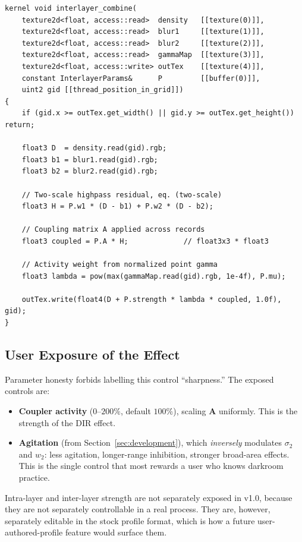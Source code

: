 \begin{lstlisting}[language=Metal, caption={Interlayer inhibition combine pass.}]
kernel void interlayer_combine(
    texture2d<float, access::read>  density   [[texture(0)]],
    texture2d<float, access::read>  blur1     [[texture(1)]],
    texture2d<float, access::read>  blur2     [[texture(2)]],
    texture2d<float, access::read>  gammaMap  [[texture(3)]],
    texture2d<float, access::write> outTex    [[texture(4)]],
    constant InterlayerParams&      P         [[buffer(0)]],
    uint2 gid [[thread_position_in_grid]])
{
    if (gid.x >= outTex.get_width() || gid.y >= outTex.get_height()) return;

    float3 D  = density.read(gid).rgb;
    float3 b1 = blur1.read(gid).rgb;
    float3 b2 = blur2.read(gid).rgb;

    // Two-scale highpass residual, eq. (two-scale)
    float3 H = P.w1 * (D - b1) + P.w2 * (D - b2);

    // Coupling matrix A applied across records
    float3 coupled = P.A * H;             // float3x3 * float3

    // Activity weight from normalized point gamma
    float3 lambda = pow(max(gammaMap.read(gid).rgb, 1e-4f), P.mu);

    outTex.write(float4(D + P.strength * lambda * coupled, 1.0f), gid);
}
\end{lstlisting}

\subsection{User Exposure of the Effect}

Parameter honesty forbids labelling this control ``sharpness.'' The exposed
controls are:

\begin{itemize}
\item \textbf{Coupler activity} ($0$--$200\%$, default $100\%$), scaling
$\mathbf{A}$ uniformly. This is the strength of the DIR effect.
\item \textbf{Agitation} (from Section~\ref{sec:development}), which
\emph{inversely} modulates $\sigma_2$ and $w_2$: less agitation, longer-range
inhibition, stronger broad-area effects. This is the single control that most
rewards a user who knows darkroom practice.
\end{itemize}

Intra-layer and inter-layer strength are not separately exposed in v1.0, because
they are not separately controllable in a real process. They are, however,
separately editable in the stock profile format, which is how a future
user-authored-profile feature would surface them.

